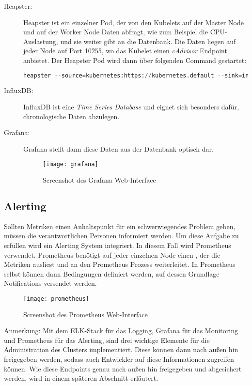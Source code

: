 \begin{description}
  \item[Heapster:]
  Heapster ist ein einzelner Pod, der von den Kubelets auf der Master Node
  und auf der Worker Node
  Daten abfragt, wie zum Beispiel die CPU-Auslastung, und sie weiter gibt an die
  Datenbank.
  Die Daten liegen auf jeder Node auf Port 10255, wo das Kubelet
  einen \emph{cAdvisor} \cite{cAdvisor} Endpoint anbietet.
  Der Heapster Pod wird dann über folgenden Command gestartet:
  \begin{lstlisting}[language=Python,numbers=none,breaklines=true]
  heapster --source=kubernetes:https://kubernetes.default --sink=influxdb:http://monitoring-influxdb:8086\end{lstlisting}

  \item[InfluxDB:] InfluxDB ist eine \emph{Time Series Database}
  und eignet sich besonders dafür,
  chronologische Daten abzulegen.
  \item[Grafana:] Grafana stellt dann diese Daten aus der Datenbank optisch dar.
  \begin{figure}[H]
  \centering
  \texttt{[image: grafana]}
  \caption{Screenshot des Grafana Web-Interface}
  \end{figure}
\end{description}

\subsection{Alerting}

Sollten Metriken einen Anhaltspunkt f\"ur ein schwerwiegendes Problem geben,
m\"ussen die verantwortlichen Personen informiert werden.
Um diese Aufgabe zu erf\"ullen wird ein Alerting System integriert. In
diesem Fall wird Prometheus \cite{prometheus}
verwendet. Prometheus benötigt auf jeder einzelnen Node einen ,
der die Metriken ausliest und an den Prometheus Prozess weiterleitet.
In Prometheus selbst können dann Bedingungen definiert werden, auf dessen Grundlage
Notifications versendet werden.

\begin{figure}[H]
\centering
\texttt{[image: prometheus]}
\caption{Screenshot des Prometheus Web-Interface}
\end{figure}

\begin{tcolorbox}
Anmerkung: Mit dem ELK-Stack für das Logging, Grafana für das Monitoring und
Prometheus für das Alerting, sind drei wichtige Elemente für die Administration
des Clusters implementiert. Diese können dann nach außen hin freigegeben werden,
sodass auch Entwickler auf diese Informationen zugreifen können.
Wie diese Endpoints genau nach außen hin freigegeben und abgesichert werden,
wird in einem späteren Abschnitt erläutert.
\end{tcolorbox}

